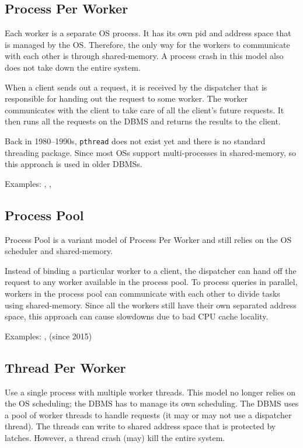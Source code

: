 \documentclass[11pt]{article}
\begin{document}
\subsection*{Process Per Worker}
Each worker is a separate OS process. It has its own pid and address space that is managed by the 
OS. Therefore, the only way for the workers to communicate with each other is through shared-memory. 
A process crash in this model also does not take down the entire system.

When a client sends out a request, it is received by the dispatcher that is responsible for handing 
out the request to some worker. The worker communicates with the client to take care of all the 
client's future requests. It then runs all the requests on the DBMS and returns the results to the 
client.

Back in 1980--1990s, \texttt{pthread} does not exist yet and there is no standard threading 
package. Since most OSs support multi-processes in shared-memory, so this approach is used in older 
DBMSs. 

Examples: , , 

\subsection*{Process Pool}
Process Pool is a variant model of Process Per Worker and still relies on the OS scheduler and 
shared-memory. 

Instead of binding a particular worker to a client, the dispatcher can hand off the request to any 
worker available in the process pool. To process queries in parallel, workers in the process pool 
can communicate with each other to divide tasks using shared-memory. Since all the workers still 
have their own separated address space, this approach can cause slowdowns due to bad CPU cache 
locality.

Examples: ,  (since 2015)

\subsection*{Thread Per Worker}
Use a single process with multiple worker threads. This model no longer relies on the OS scheduling; 
the DBMS has to manage its own scheduling. The DBMS uses a pool of worker threads to handle requests 
(it may or may not use a dispatcher thread). The threads can write to shared address space that is 
protected by latches. However, a thread crash (may) kill the entire system.
\end{document}
